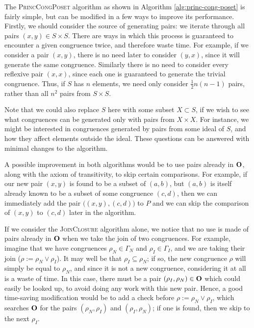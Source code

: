 The \textsc{PrincCongPoset} algorithm as shown in Algorithm
\ref{alg:princ-cong-poset} is fairly simple, but can be modified in a few ways
to improve its performance.  Firstly, we should consider the source of
generating pairs: we iterate through all pairs $(x,y) \in S \times S$.  There
are ways in which this process is guaranteed to encounter a given congruence
twice, and therefore waste time.  For example, if we consider a pair $(x,y)$,
there is no need later to consider $(y,x)$, since it will generate the same
congruence.  Similarly there is no need to consider every reflexive pair
$(x,x)$, since each one is guaranteed to generate the trivial congruence.  Thus,
if $S$ has $n$ elements, we need only consider $\frac{1}{2}n(n-1)$ pairs, rather
than all $n^2$ pairs from $S \times S$.

Note that we could also replace $S$ here with some subset $X \subset S$, if we
wish to see what congruences can be generated only with pairs from $X \times X$.
For instance, we might be interested in congruences generated by pairs from some
ideal of $S$, and how they affect elements outside the ideal.  These questions
can be answered with minimal changes to the algorithm.

A possible improvement in both algorithms would be to use pairs already in
$\mathbf{O}$, along with the axiom of transitivity, to skip certain comparisons.  For
example, if our new pair $(x,y)$ is found to be a subset of $(a,b)$, but $(a,b)$
is itself already known to be a subset of some congruence $(c,d)$, then we can
immediately add the pair $\big((x,y), (c,d)\big)$ to $P$ and we can skip the
comparison of $(x,y)$ to $(c,d)$ later in the algorithm.

If we consider the \textsc{JoinClosure} algorithm alone, we notice that no use
is made of pairs already in $\mathbf{O}$ when we take the join of two congruences.  For
example, imagine that we have congruences $\rho_N \in \Gamma_N$ and
$\rho_I \in \Gamma_I$, and we are taking their join
($\rho := \rho_N \vee \rho_I$).  It may well be that $\rho_I \subseteq \rho_N$;
if so, the new congruence $\rho$ will simply be equal to $\rho_N$, and since it
is not a new congruence, considering it at all is a waste of time.  In this
case, there must be a pair $(\rho_I, \rho_N) \in \mathbf{O}$ which could easily be
looked up, to avoid doing any work with this new pair.  Hence, a good
time-saving modification would be to add a check before
$\rho := \rho_N \vee \rho _I$, which searches $\mathbf{O}$ for the pairs
$(\rho_N, \rho_I)$ and $(\rho_I, \rho_N)$; if one is found, then we skip to the
next $\rho_I$.

